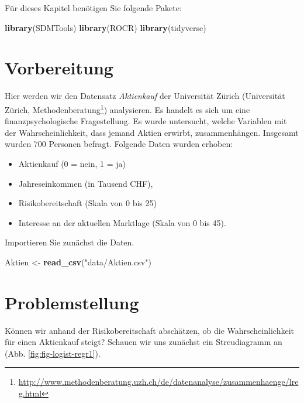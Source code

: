 \documentclass[12pt,ngerman,]{book}
\makeatletter
\newenvironment{Shaded}{\begin{snugshade}}{\end{snugshade}}
\newcommand{\KeywordTok}[1]{\textcolor[rgb]{0.13,0.29,0.53}{\textbf{{#1}}}}
\newcommand{\StringTok}[1]{\textcolor[rgb]{0.31,0.60,0.02}{{#1}}}
\newcommand{\NormalTok}[1]{{#1}}
\providecommand{\tightlist}{%
  \setlength{\itemsep}{0pt}\setlength{\parskip}{0pt}}
\let\rmarkdownfootnote\footnote%
\def\footnote{\protect\rmarkdownfootnote}
\renewcommand{\href}[2]{#2\footnote{\url{#1}}}
\newenvironment{kframe}{%
\medskip{}
\setlength{\fboxsep}{.8em}
 \def\at@end@of@kframe{}%
 \ifinner\ifhmode%
  \def\at@end@of@kframe{\end{minipage}}%
  \begin{minipage}{\columnwidth}%
 \fi\fi%
 \def\FrameCommand##1{\hskip\@totalleftmargin \hskip-\fboxsep
 \colorbox{shadecolor}{##1}\hskip-\fboxsep
     \hskip-\linewidth \hskip-\@totalleftmargin \hskip\columnwidth}%
 \MakeFramed {\advance\hsize-\width
   \@totalleftmargin\z@ \linewidth\hsize
   \@setminipage}}%
 {\par\unskip\endMakeFramed%
 \at@end@of@kframe}
\renewenvironment{Shaded}{\begin{kframe}}{\end{kframe}}
\makeatother
\begin{document}
Für dieses Kapitel benötigen Sie folgende Pakete:

\begin{Shaded}
\begin{Highlighting}[]
\KeywordTok{library}\NormalTok{(SDMTools)}
\KeywordTok{library}\NormalTok{(ROCR)}
\KeywordTok{library}\NormalTok{(tidyverse)}
\end{Highlighting}
\end{Shaded}

\section{Vorbereitung}\label{vorbereitung}

Hier werden wir den Datensatz \emph{Aktienkauf} der Universität Zürich
(\href{http://www.methodenberatung.uzh.ch/de/datenanalyse/zusammenhaenge/lreg.html}{Universität
Zürich, Methodenberatung}) analysieren. Es handelt es sich um eine
finanzpsychologische Fragestellung. Es wurde untersucht, welche
Variablen mit der Wahrscheinlichkeit, dass jemand Aktien erwirbt,
zusammenhängen. Insgesamt wurden 700 Personen befragt. Folgende Daten
wurden erhoben:

\begin{itemize}
\tightlist
\item
  Aktienkauf (0 = nein, 1 = ja)
\item
  Jahreseinkommen (in Tausend CHF),
\item
  Risikobereitschaft (Skala von 0 bis 25)
\item
  Interesse an der aktuellen Marktlage (Skala von 0 bis 45).
\end{itemize}

Importieren Sie zunächst die Daten.

\begin{Shaded}
\begin{Highlighting}[]
\NormalTok{Aktien <-}\StringTok{ }\KeywordTok{read_csv}\NormalTok{(}\StringTok{"data/Aktien.csv"}\NormalTok{)}
\end{Highlighting}
\end{Shaded}

\section{Problemstellung}\label{problemstellung}

Können wir anhand der Risikobereitschaft abschätzen, ob die
Wahrscheinlichkeit für einen Aktienkauf steigt? Schauen wir uns zunächst
ein Streudiagramm an (Abb. \ref{fig:fig-logist-regr1}).
\end{document}
